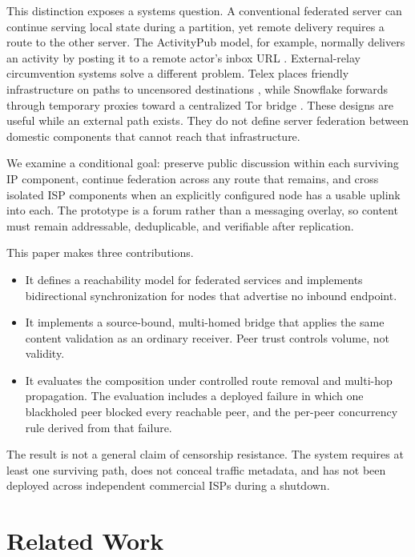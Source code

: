 \documentclass[conference,a4paper]{IEEEtran}
\begin{document}
This distinction exposes a systems question. A conventional federated server can continue serving
local state during a partition, yet remote delivery requires a route to the other server. The
ActivityPub model, for example, normally delivers an activity by posting it to a remote actor's inbox
URL \cite{activitypub}. External-relay circumvention systems solve a different problem. Telex places
friendly infrastructure on paths to uncensored destinations \cite{wustrow2011telex}, while
Snowflake forwards through temporary proxies toward a centralized Tor bridge
\cite{bocovich2024snowflake}. These designs are useful while an external path exists. They do not
define server federation between domestic components that cannot reach that infrastructure.

We examine a conditional goal: preserve public discussion within each surviving IP component,
continue federation across any route that remains, and cross isolated ISP components when an
explicitly configured node has a usable uplink into each. The prototype is a forum rather than a
messaging overlay, so content must remain addressable, deduplicable, and verifiable after replication.

This paper makes three contributions.

\begin{itemize}
  \item It defines a reachability model for federated services and implements bidirectional
  synchronization for nodes that advertise no inbound endpoint.
  \item It implements a source-bound, multi-homed bridge that applies the same content validation as
  an ordinary receiver. Peer trust controls volume, not validity.
  \item It evaluates the composition under controlled route removal and multi-hop propagation. The
  evaluation includes a deployed failure in which one blackholed peer blocked every reachable peer,
  and the per-peer concurrency rule derived from that failure.
\end{itemize}

The result is not a general claim of censorship resistance. The system requires at least one
surviving path, does not conceal traffic metadata, and has not been deployed across independent
commercial ISPs during a shutdown.

\section{Related Work}
\end{document}
